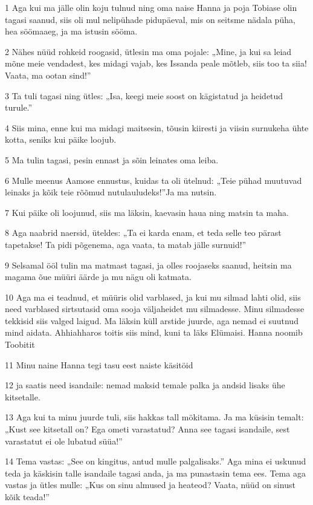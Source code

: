 \par 1 Aga kui ma jälle olin koju tulnud ning oma naise Hanna ja poja  Tobiase olin tagasi saanud, siis oli mul nelipühade pidupäeval, mis  on seitsme nädala püha, hea söömaaeg, ja ma istusin sööma.
\par 2 Nähes nüüd rohkeid roogasid, ütlesin ma oma pojale: „Mine, ja kui  sa leiad mõne meie vendadest, kes midagi vajab, kes Issanda peale mõtleb,  siis too ta siia! Vaata, ma ootan sind!”
\par 3 Ta tuli tagasi ning ütles: „Isa, keegi meie soost on  kägistatud ja heidetud turule.”
\par 4 Siis mina, enne kui ma midagi maitsesin, tõusin kiiresti ja  viisin surnukeha ühte kotta, seniks kui päike loojub.
\par 5 Ma tulin tagasi, pesin ennast ja sõin leinates oma leiba.
\par 6 Mulle meenus Aamose ennustus, kuidas ta oli ütelnud: „Teie pühad muutuvad leinaks ja kõik teie rõõmud nutulauludeks!”Ja ma nutsin.
\par 7 Kui päike oli loojunud, siis ma läksin, kaevasin haua ning  matsin ta maha.
\par 8 Aga naabrid naersid, üteldes: „Ta ei karda enam, et teda selle  teo pärast tapetakse! Ta pidi põgenema, aga vaata, ta matab jälle  surnuid!”
\par 9 Selsamal ööl tulin ma matmast tagasi, ja olles roojaseks saanud,  heitsin ma magama õue müüri äärde ja mu nägu oli katmata.
\par 10 Aga ma ei teadnud, et müüris olid varblased, ja kui mu silmad  lahti olid, siis need varblased sirtsutasid oma sooja väljaheidet mu  silmadesse. Minu silmadesse tekkisid siis valged laigud. Ma läksin  küll arstide juurde, aga nemad ei suutnud mind aidata. Ahhiahharos  toitis siis mind, kuni ta läks Elümaisi. Hanna noomib Toobitit
\par 11 Minu naine Hanna tegi tasu eest naiste käsitöid
\par 12 ja saatis need isandaile: nemad maksid temale palka ja andsid  lisaks ühe kitsetalle.
\par 13 Aga kui ta minu juurde tuli, siis hakkas tall mökitama. Ja ma  küsisin temalt: „Kust see kitsetall on? Ega ometi varastatud? Anna  see tagasi isandaile, sest varastatut ei ole lubatud süüa!”
\par 14 Tema vastas: „See on kingitus, antud mulle palgalisaks.” Aga mina  ei uskunud teda ja käskisin talle isandaile tagasi anda, ja ma  punastasin tema ees. Tema aga vastas ja ütles mulle: „Kus on sinu  almused ja heateod? Vaata, nüüd on sinust kõik teada!”

